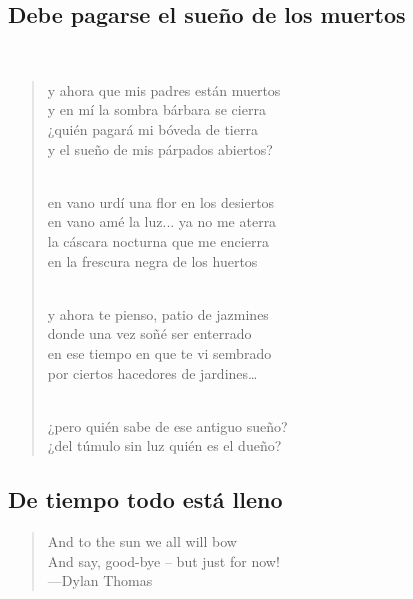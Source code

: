 \documentclass[a4paper, 12pt]{article}
\begin{document}
\subsection{Debe pagarse el sueño de los muertos}
~ 

\begin{verse}
y ahora que mis padres están muertos\\
y en mí la sombra bárbara se cierra\\
¿quién pagará mi bóveda de tierra\\
y el sueño de mis párpados abiertos?\\
~ 

en vano urdí una flor en los desiertos\\
en vano amé la luz... ya no me aterra\\
la cáscara nocturna que me encierra\\
en la frescura negra de los huertos\\
~ 

y ahora te pienso, patio de jazmines\\
donde una vez soñé ser enterrado\\
en ese tiempo en que te vi sembrado\\
por ciertos hacedores de jardines…\\
~ 

¿pero quién sabe de ese antiguo sueño?\\
¿del túmulo sin luz quién es el dueño?\\
\end{verse}

\pagebreak
\subsection{De tiempo todo está lleno}

\scriptsize
\begin{quote}
    \hspace*{\fill}And to the sun we all will bow\\
\hspace*{\fill}And say, good-bye – but just for now!\\
\hspace*{\fill}—Dylan Thomas
\end{quote}
\normalsize
\end{document}
